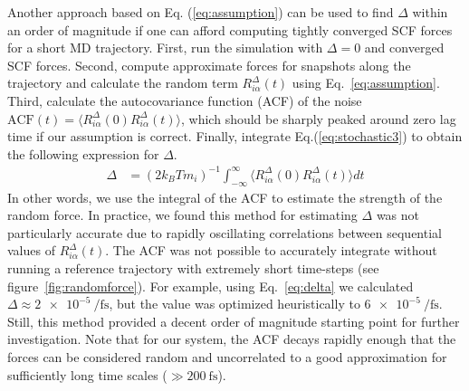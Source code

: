 \documentclass[aps,prl,reprint,amsmath,amssymb]{revtex4-1}
\begin{document}
Another approach based on Eq. (\ref{eq:assumption}) can be used to find $\Delta$ within an order of magnitude if one can afford computing tightly converged SCF forces for a short MD trajectory. 
First, run the simulation with $\Delta = 0$ and converged SCF forces. 
Second, compute approximate forces for snapshots along the trajectory and calculate the random term $R^{\Delta}_{i\alpha} (t)$ using Eq.\ \ref{eq:assumption}. 
Third, calculate the autocovariance function (ACF) of the noise $\text{ACF}(t) = \langle R^{\Delta}_{i\alpha} (0)  R^{\Delta}_{i\alpha} (t) \rangle$, which should be sharply peaked around zero lag time if our assumption is correct. 
Finally, integrate Eq.(\ref{eq:stochastic3}) to obtain the following expression for $\Delta$.
%
\begin{align}
\label{eq:delta}
\Delta &= (2 k_B T m_i )^{-1} \int_{-\infty}^{\infty}\langle R^{\Delta}_{i\alpha} (0)  R^{\Delta}_{i\alpha} (t) \rangle dt
\end{align}
%
In other words, we use the integral of the ACF to estimate the strength of the random force. 
In practice, we found this method for estimating $\Delta$ was not particularly accurate due to rapidly oscillating correlations between sequential values of $R^{\Delta}_{i\alpha} (t)$. 
The ACF was not possible to accurately integrate without running a reference trajectory with extremely short time-steps (see figure~\ref{fig:randomforce}).
For example, using Eq.\ \ref{eq:delta} we calculated $\Delta \approx \SI{2e-5}{\per\fs}$, but the value was optimized heuristically to $\SI{6e-5}{\per\fs}$.
Still, this method provided a decent order of magnitude starting point for further investigation.
Note that for our system, the ACF decays rapidly enough that the forces can be considered random and uncorrelated to a good approximation for sufficiently long time scales ($\gg\SI{200}{\fs}$).
\end{document}
